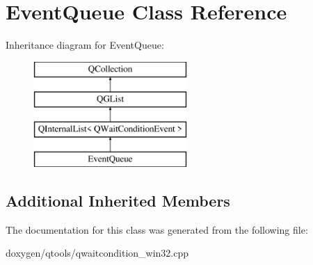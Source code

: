 \hypertarget{class_event_queue}{}\section{Event\+Queue Class Reference}
\label{class_event_queue}
Inheritance diagram for Event\+Queue\+:\begin{figure}[H]
\begin{center}
\leavevmode
\includegraphics[height=4.000000cm]{class_event_queue}
\end{center}
\end{figure}
\subsection*{Additional Inherited Members}


The documentation for this class was generated from the following file\+:\begin{DoxyCompactItemize}
\item 
doxygen/qtools/qwaitcondition\+\_\+win32.\+cpp\end{DoxyCompactItemize}
